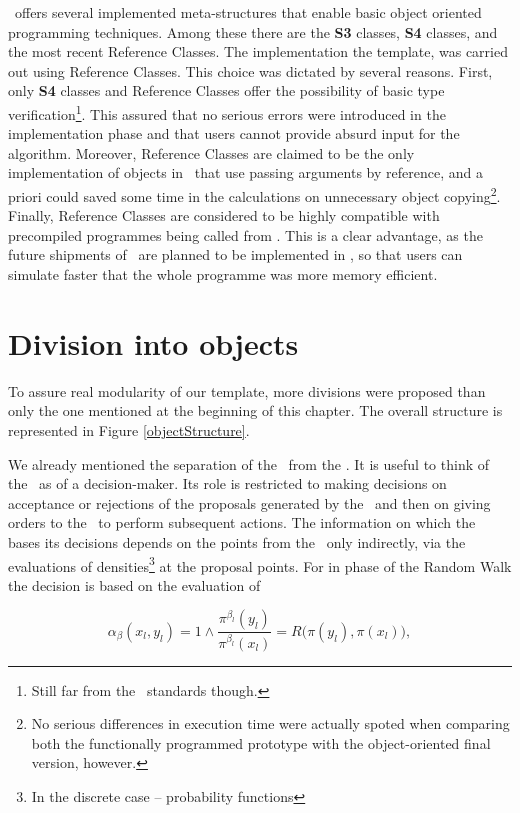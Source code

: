 \RR\, offers several implemented meta-structures that enable basic object oriented programming techniques. Among these there are the \textbf{S3} classes, \textbf{S4} classes, and the most recent Reference Classes. The implementation the template, was carried out using Reference Classes. This choice was dictated by several reasons. First, only \textbf{S4} classes and Reference Classes offer the possibility of basic type verification\footnote{Still far from the \Cpp\, standards though.}. This assured that no serious errors were introduced in the implementation phase and that users cannot provide absurd input for the algorithm. Moreover, Reference Classes are claimed to be the only implementation of objects in \RR\, that use passing arguments by reference, and a priori could saved some time in the calculations on unnecessary object copying\footnote{No serious differences in execution time were actually spoted when comparing both the functionally programmed prototype with the object-oriented final version, however.}. Finally, Reference Classes are considered to be highly compatible with \Cpp\, precompiled programmes being called from \RR. This is a clear advantage, as the future shipments of \ssimul\, are planned to be implemented in \Cpp, so that users can simulate faster that the whole programme was more memory efficient.   

\section{Division into objects}

To assure real modularity of our template, more divisions were proposed than only the one mentioned at the beginning of this chapter. The overall structure is represented in Figure \ref{objectStructure}.

We already mentioned the separation of the \algo\, from the \sspace. It is useful to think of the \algo\, as of a decision-maker. Its role is restricted to making decisions on acceptance or rejections of the proposals generated by the \sspace\, and then on giving orders to the \sspace\, to perform subsequent actions. The information on which the \algo\, bases its decisions depends on the points from the \sspace\, only indirectly, via the evaluations of densities\footnote{In the discrete case -- probability functions} at the proposal points. For in phase of the Random Walk the decision is based on the evaluation of 

\begin{equation*}
	\alpha_\beta(x_l , y_l) = 1 \wedge \frac{\pi^{\beta_l}(y_l)}{\pi^{\beta_l}(x_l)} = R\Big(\pi(y_l),\pi(x_l)\Big),
\end{equation*}

